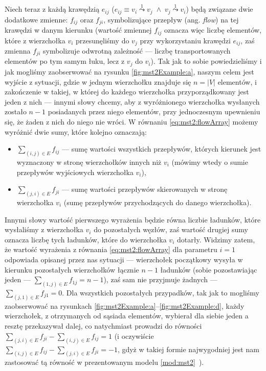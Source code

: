 Niech teraz z każdą krawędzią $e_{ij}$ ($e_{ij} \equiv v_{i} \overset{1}{\leadsto} v_{j} \; \wedge \; v_{j} \overset{1}{\leadsto} v_{i}$) będą związane dwie dodatkowe zmienne: $f_{ij}$ oraz $f_{ji}$, symbolizujące przepływ (ang. \textit{flow}) na tej krawędzi w danym kierunku (wartość zmiennej $f_{ij}$ oznacza więc liczbę elementów, które z wierzchołka $v_{i}$ przesunęliśmy do $v_{j}$ przy wykorzystaniu krawędzi $e_{ij}$, zaś zmienna $f_{ji}$ symbolizuje odwrotną zależność --- liczbę transportowanych elementów po tym samym łuku, lecz z $v_{j}$ do $v_{i}$). Tak jak to sobie powiedzieliśmy i jak mogliśmy zaobserwować na rysunku \ref{fig:mst2Example:a}, naszym celem jest wyjście z sytuacji, gdzie w jednym wierzchołku znajduje się $n = \left| V \right|$ elementów, i zakończenie w takiej, w której do każdego wierzchołka przyporządkowany jest jeden z nich --- innymi słowy chcemy, aby z wyróżnionego wierzchołka wysłanych zostało $n - 1$ posiadanych przez niego elementów, przy jednoczesnym upewnieniu się, że żaden z nich do niego nie wróci. W równaniu \ref{eq:mst2:flowArray} możemy wyróżnić dwie sumy, które kolejno oznaczają:

\begin{itemize}
	\item $\sum_{ \left( i, j \right ) \in E } f_{ij}$ --- sumę wartości wszystkich przepływów, których kierunek jest wyznaczony w stronę wierzchołków innych niż $v_{i}$ (mówimy wtedy o sumie przepływów wyjściowych wierzchołka $v_{i}$),
	\item $\sum_{ \left( j, i \right ) \in E } f_{ji}$ --- sumę wartości przepływów skierowanych w stronę wierzchołka $v_{i}$ (sumę przepływów przychodzących do danego wierzchołka).
\end{itemize}

Innymi słowy wartość pierwszego wyrażenia będzie równa liczbie ładunków, które wysłaliśmy z wierzchołka $v_{i}$ do pozostałych węzłów, zaś wartość drugiej sumy oznacza liczbę tych ładunków, które do wierzchołka $v_{i}$ dotarły. Widzimy zatem, że wartość wyrażenia z równania \ref{eq:mst2:flowArray} dla parametru $i = 1$ odpowiada opisanej przez nas sytuacji --- wierzchołek początkowy wysyła w kierunku pozostałych wierzchołków łącznie $n - 1$ ładunków (sobie pozostawiając jeden --- $\sum_{ \left( 1, j \right ) \in E } f_{1j} = n - 1$), zaś sam nie przyjmuje żadnych --- $\sum_{ \left( j, 1 \right ) \in E } f_{j1} = 0$. Dla wszystkich pozostałych przypadków, tak jak to mogliśmy zaobserwować na rysunkach \ref{fig:mst2Example:a}--\ref{fig:mst2Example:d}, każdy wierzchołek, z otrzymanych od sąsiada elementów, wybierał dla siebie jeden a resztę przekazywał dalej, co natychmiast prowadzi do równości $\sum_{ \left( j, i \right ) \in E } f_{ji} - \sum_{ \left( i, j \right ) \in E } f_{ij} = 1$ (i oczywiście $\sum_{ \left( i, j \right ) \in E } f_{ij} - \sum_{ \left( j, i \right ) \in E } f_{ji} = -1$, gdyż w takiej formie najwygodniej jest nam zastosować tą równość w prezentowanym modelu \ref{mod:mst2}~\cite[$35$]{robustSTP}).

